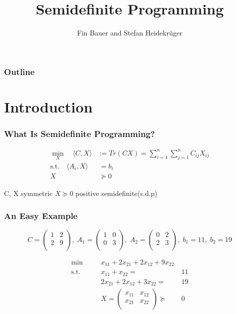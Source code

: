 \documentclass[11pt]{beamer}
\author{Fin Bauer and Stefan Heidekrüger}
\title{Semidefinite Programming}
\begin{document}
	\maketitle
\begin{frame}
	\frametitle{Outline}
	\tableofcontents
\end{frame}
\section{Introduction}	
	\begin{frame}
		\frametitle{What Is Semidefinite Programming?}
	\begin{block}{\vspace*{-3ex}}
		\begin{equation*}
		\begin{aligned}
		\min_X \quad\langle C,X \rangle &:= Tr(CX)=\sum_{i=1}^{n}\sum_{j=1}^{n}C_{ij}X_{ij}\\
		\text{s.t.}\quad\langle A_i,X\rangle&\:= b_i\\
		X&\:\succeq 0
		\end{aligned}
		\end{equation*}
	\end{block}
	C, X symmetric $X \succeq 0$ positive semidefinite(s.d.p)
	\end{frame}
	\begin{frame}
		\frametitle{An Easy Example}
		\begin{equation*}
		C=\begin{pmatrix}
		1 & 2 \\
		2 & 9 \\
		\end{pmatrix},\; A_1=\begin{pmatrix}
		1 & 0 \\
		0 & 3 \\
		\end{pmatrix},\; A_2=\begin{pmatrix}
		0 & 2 \\
		2 & 3 \\
		\end{pmatrix},\; b_1=11,\; b_2=19
		\end{equation*}
		\pause
		\begin{block}{\vspace*{-3ex}}
		\begin{equation*}
		\begin{aligned}
		\min\quad && x_{11}+2x_{21}+2x_{12}+9x_{22}\\
		\text{s.t.}\quad&& x_{11}+x_{22}= & \:11\\
		&&  2x_{21}+2x_{12}+3x_{22}= & \:19\\
		&& X=\begin{pmatrix}
		x_{11}& x_{12}\\
		x_{21}& x_{22}\\
		\end{pmatrix}\succeq&\: 0
		\end{aligned}
		\end{equation*}
		\end{block}
	\end{frame}
\end{document}
